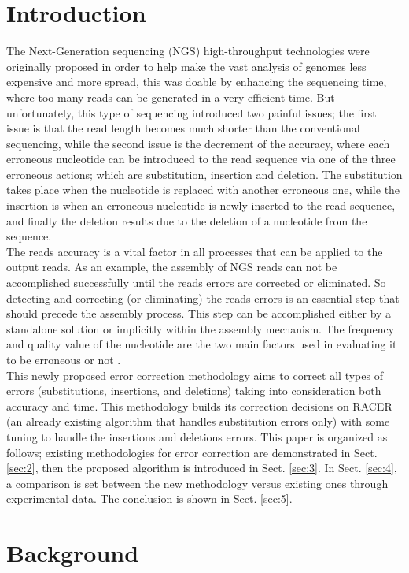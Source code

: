 \documentclass{llncs}
\begin{document}
\section{Introduction}
%
The Next-Generation sequencing (NGS) high-throughput technologies \cite{NGS} were originally proposed in order to help make the vast analysis of genomes less expensive and more spread, this was doable by enhancing the sequencing time, where too many reads can be generated in a very efficient time. But unfortunately, this type of sequencing introduced two painful issues; the first issue is that the read length becomes much shorter than the conventional sequencing, while the second issue is the decrement of the accuracy, where each erroneous nucleotide can be introduced to the read sequence via one of the three erroneous actions; which are substitution, insertion and deletion. The substitution takes place when the nucleotide is replaced with another erroneous one, while the insertion is when an erroneous nucleotide is newly inserted to the read sequence, and finally the deletion results due to the deletion of a nucleotide from the sequence.
\\
The reads accuracy is a vital factor in all processes that can be applied to the output reads. As an example, the assembly of NGS reads can not be accomplished successfully until the reads errors are corrected or eliminated. So detecting and correcting (or eliminating) the reads errors is an essential step that should precede the assembly process. This step can be accomplished either by a standalone solution or implicitly within the assembly mechanism. The frequency and quality value of the nucleotide are the two main factors used in evaluating it to be erroneous or not \cite{ErrCorr}.
\\
This newly proposed error correction methodology aims to correct all types of errors (substitutions, insertions, and deletions) taking into consideration both accuracy and time. This methodology builds its correction decisions on RACER \cite{Racer} (an already existing algorithm that handles substitution errors only) with some tuning to handle the insertions and deletions errors.
This paper is organized as follows; existing methodologies for error correction are demonstrated in Sect. \ref{sec:2}, then the proposed algorithm is introduced in Sect. \ref{sec:3}. In Sect. \ref{sec:4}, a comparison is set between the new methodology versus existing ones through experimental data. The conclusion is shown in Sect. \ref{sec:5}.
%

\section{\label{sec:2}Background}
\end{document}
